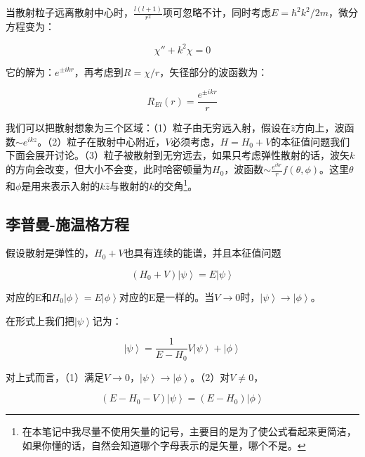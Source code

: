 当散射粒子远离散射中心时，$\frac{l(l+1)}{r^2}$项可忽略不计，同时考虑$E = \hbar^2 k^2 /2m$，微分方程变为：

\begin{equation}
\chi'' + k^2 \chi = 0
\end{equation}

它的解为：$e^{\pm i kr}$，再考虑到$R = \chi / r$，矢径部分的波函数为：

\begin{equation}
R_{El} (r) = \frac{e^{\pm i kr} }{r}
\end{equation}

我们可以把散射想象为三个区域：（1）粒子由无穷远入射，假设在$\hat z$方向上，波函数$\sim e^{i kz}$。（2）粒子在散射中心附近，$V$必须考虑，$H = H_0 +V $的本征值问题我们下面会展开讨论。（3）粒子被散射到无穷远去，如果只考虑弹性散射的话，波矢$k$的方向会改变，但大小不会变，此时哈密顿量为$H_0$，波函数$\sim \frac{e^{ikr}}{r} f( \theta, \phi )$。这里$\theta $和$\phi$是用来表示入射的$k \hat z$与散射的$k$的交角\footnote{在本笔记中我尽量不使用矢量的记号，主要目的是为了使公式看起来更简洁，如果你懂的话，自然会知道哪个字母表示的是矢量，哪个不是。}。

\subsection{李普曼-施温格方程}

假设散射是弹性的，$H_0 + V$也具有连续的能谱，并且本征值问题

\begin{equation}
( H_0 + V ) \left| \psi \right\rangle = E \left| \psi \right\rangle
\end{equation}

对应的E和$H_0 \left| \phi \right\rangle = E \left| \phi \right\rangle$对应的E是一样的。当$V \to 0$时，$\left| \psi \right\rangle \to \left| \phi \right\rangle$。

在形式上我们把$\left| \psi \right\rangle$记为：

\begin{equation}
\left| \psi \right\rangle = \frac{1}{E - H_0} V \left| \psi \right\rangle + \left| \phi \right\rangle
\end{equation}

对上式而言，（1）满足$V \to 0$，$\left| \psi \right\rangle \to \left| \phi \right\rangle$。（2）对$V \neq 0$，

\begin{equation}
(E - H_0 - V) \left| \psi \right\rangle = ( E - H_0 ) \left| \phi \right\rangle
\end{equation}

